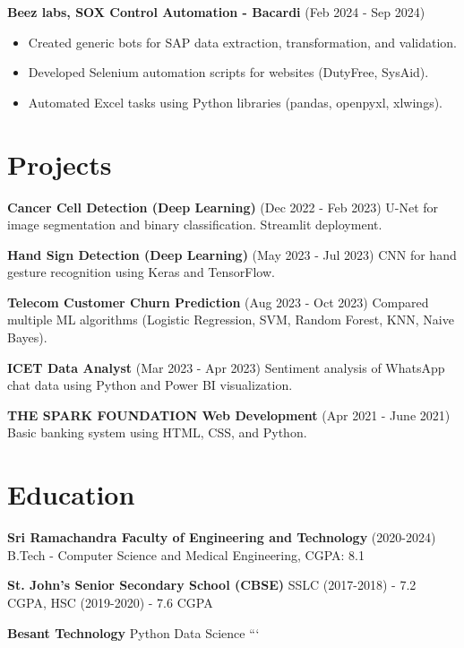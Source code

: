 \textbf{Beez labs, SOX Control Automation - Bacardi} (Feb 2024 - Sep 2024)
\begin{itemize}
    \item Created generic bots for SAP data extraction, \newline transformation, and validation.
    \item Developed Selenium automation scripts for \newline websites (DutyFree, SysAid).
    \item Automated Excel tasks using Python libraries \newline (pandas, openpyxl, xlwings).
\end{itemize}


\section{Projects}
\textbf{Cancer Cell Detection (Deep Learning)} (Dec 2022 - Feb 2023)
U-Net for image segmentation and binary classification. Streamlit deployment.

\textbf{Hand Sign Detection (Deep Learning)} (May 2023 - Jul 2023)
CNN for hand gesture recognition using Keras and TensorFlow.

\textbf{Telecom Customer Churn Prediction} (Aug 2023 - Oct 2023)
Compared multiple ML algorithms (Logistic Regression, \newline SVM, Random Forest, KNN, Naive Bayes).

\textbf{ICET Data Analyst} (Mar 2023 - Apr 2023)
Sentiment analysis of WhatsApp chat data using Python \newline and Power BI visualization.

\textbf{THE SPARK FOUNDATION Web Development} (Apr 2021 - June 2021)
Basic banking system using HTML, CSS, and Python.


\section{Education}
\textbf{Sri Ramachandra Faculty of Engineering and Technology} (2020-2024)
B.Tech - Computer Science and Medical Engineering, CGPA: 8.1

\textbf{St. John’s Senior Secondary School (CBSE)}
SSLC (2017-2018) - 7.2 CGPA, HSC (2019-2020) - 7.6 CGPA

\textbf{Besant Technology}
Python Data Science
```


